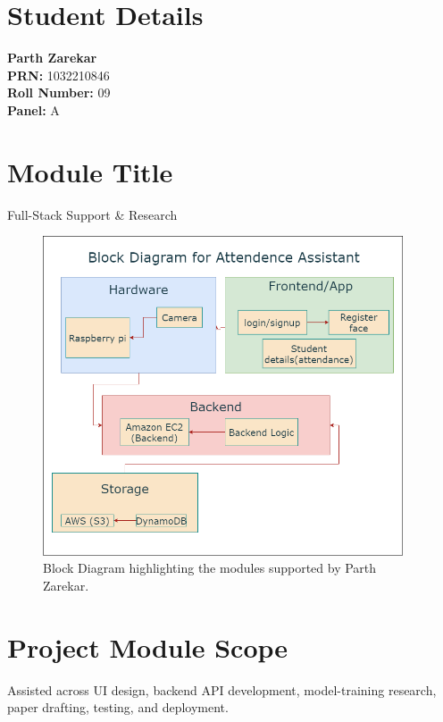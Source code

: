 \documentclass[openany]{report}
\begin{document}
\section{Student Details}
\textbf{Parth Zarekar} \\
\textbf{PRN:} 1032210846 \\
\textbf{Roll Number:} 09 \\
\textbf{Panel:} A \\

\section{Module Title}
Full-Stack Support \& Research

\begin{figure}[H]
  \centering
  \includegraphics[width=0.95\textwidth]{../imgs/block diagram.png}
  \caption{Block Diagram highlighting the modules supported by Parth Zarekar.}
  \label{fig:block_diagram_parth}
\end{figure}

\section{Project Module Scope}
Assisted across UI design, backend API development, model-training research, paper drafting, testing, and deployment.
\end{document}
